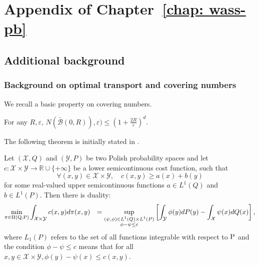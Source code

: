 \chapter{Appendix of Chapter~\ref{chap: wass-pb}}
\label{ap:mv-sto}

\minitoc

\begin{noaddcontents}

\section{Additional background}
\label{sec: background}

\subsection{Background on optimal transport and covering numbers}
\label{sec: back_compact}



We recall a basic property on covering numbers.

\begin{proposition}
\label{prop: covering}
For any $R,\varepsilon$, $N(\bar{\mathcal{B}}(0,R)), \varepsilon) \leq \left(1+\frac{2R}{\varepsilon}\right)^d$.
\end{proposition}
The following theorem is initially stated in \citep[Theorem 5.10]{villani2009optimal}.
\begin{theorem}
\label{th: kanto_dual}
Let $(\mathcal{X}, Q)$ and $(\mathcal{Y}, P)$ be two Polish probability spaces and let $c: \mathcal{X} \times \mathcal{Y} \rightarrow \mathbb{R} \cup\{+\infty\}$ be a lower semicontinuous cost function, such that
$$
\forall(x, y) \in \mathcal{X} \times \mathcal{Y}, \quad c(x, y) \geq a(x)+b(y)
$$
for some real-valued upper semicontinuous functions $a \in L^1(Q)$ and $b \in L^1(P)$. Then there is duality:
$$
\begin{aligned}
\min _{\pi \in \Pi(\Q,\P)} & \int_{\mathcal{X} \times \mathcal{Y}} c(x, y) d \pi(x, y) & =\sup _{\substack{(\psi, \phi) \in L^1(Q) \times L^1(P)\\ \phi-\psi \leq c}}\left[\int_{\mathcal{Y}} \phi(y) dP(y)-\int_{\mathcal{X}} \psi(x) dQ(x)\right],
\end{aligned}
$$
where $L_1(P)$ refers to the set of all functions integrable with respect to $\P$ and the condition $\phi-\psi \leq c$ means that for all $x,y \in \mathcal{X}\times \mathcal{Y}, \phi(y)-\psi(x) \leq c(x,y)$.
\end{theorem}



\end{noaddcontents}
